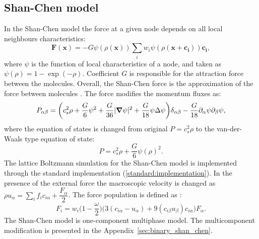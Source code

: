 \documentclass[mathpazo]{cicp}
\begin{document}
\subsection{Shan-Chen model}
In the Shan-Chen model \cite{Shan-chen:extended} the force at a given node depends
on all local neighbours characteristics:
\begin{equation}  \label{Shan-Chen:Shan-Chen:cont}
\bm{F}(\bm{x})=-G\psi(\rho(\bm{x}))\sum_{i}{w_i \psi(\rho(\bm{x}+\bm{c_i}))\bm{c_{i}}},
\end{equation}
where $\psi$ is the function of local characteristics of a node, and taken
as $\psi(\rho)=1-\exp(-\rho)$. Coefficient $G$ is responsible for the attraction
force between the molecules. Overall, the Shan-Chen force is the approximation of
the force between molecules \cite{kwok,kwok-contact-angle}. The force modifies
the momentum fluxes as:
\begin{equation*}
P_{\alpha\beta}=\biggl(c_s^2\rho+\frac{G}{6}\psi^2+\frac{G}{36}%
|\bm{\nabla}\psi|^2 +\frac{G}{18}\psi\Delta\psi\biggr)\delta_{\alpha\beta}-\frac{G}{%
18}\partial_{\alpha}\psi\partial_{\beta}\psi,
\end{equation*}
where the equation of states is changed from original $P=c_s^2 \rho$ \cite{Succi-book}
to the van-der-Waals type equation of state:
\begin{equation}
P=c_s^2 \rho +\frac{G}{6} \psi(\rho)^2.
\end{equation}
The lattice Boltzmann simulation for the Shan-Chen model is implemented through the standard implementation (\ref{standard:implementation}). In the presence of the external force the macroscopic velocity is changed as $\rho u_{\alpha}=\sum_i{f_i c_{i\alpha}}+\dfrac{F_{\alpha}}{2}$. The force population is defined as \cite{guo}:
\begin{equation}
F_i=w_i\biggl(1-\frac{\omega}{2}\biggr)\biggl(3 (c_{i\alpha}-u_{\alpha}) + 9 (c_{i\beta}u_{\beta})c_{i\alpha}\biggr)F_{\alpha}.
\end{equation}
The Shan-Chen model is one-component multiphase model. The multicomponent modification is presented in the Appendix~\ref{sec:binary_shan_chen}.
\end{document}
